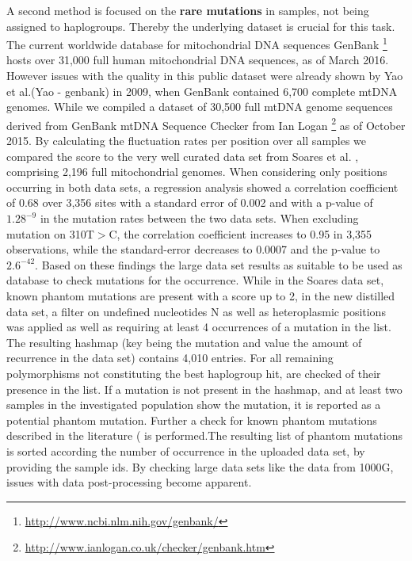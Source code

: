 A second method is focused on the \textbf{rare mutations} in samples, not being assigned to haplogroups. Thereby the underlying dataset is crucial for this task. The current worldwide database for mitochondrial DNA sequences GenBank \footnote{\url{http://www.ncbi.nlm.nih.gov/genbank/}} hosts over 31,000 full human mitochondrial DNA sequences, as of March 2016. However issues with the quality in this public dataset were already shown by Yao et al.(Yao - genbank) in 2009, when GenBank contained 6,700 complete mtDNA genomes. While we compiled a dataset of 30,500 full mtDNA genome sequences derived from GenBank mtDNA Sequence Checker from Ian Logan \footnote{\url{http://www.ianlogan.co.uk/checker/genbank.htm}} as of October 2015. By calculating the fluctuation rates per position over all samples we compared the score to the very well curated data set from Soares et al. \cite{Soares2009}, comprising 2,196 full mitochondrial genomes. When considering only positions occurring in both data sets, a regression analysis showed a correlation coefficient of 0.68 over 3,356 sites with a standard error of 0.002 and with a p-value of $1.28^{-9}$ in the mutation rates between the two data sets. When excluding mutation on 310T$>$C, the correlation coefficient increases to 0.95 in 3,355 observations, while the standard-error decreases to 0.0007 and the p-value to $2.6^{-42}$. Based on these findings the large data set results as suitable to be used as database to check mutations for the occurrence. While in the Soares data set, known phantom mutations are present with a score up to 2, in the new distilled data set, a filter on undefined nucleotides N as well as heteroplasmic positions was applied as well as requiring at least 4 occurrences of a mutation in the list. The resulting hashmap (key being the mutation and value the amount of recurrence in the data set) contains 4,010 entries. For all remaining polymorphisms not constituting the best haplogroup hit, are checked of their presence in the list. If a mutation is not present in the hashmap, and at least two samples in the investigated population show the mutation, it is reported as a potential phantom mutation. Further a check for known phantom mutations described in the literature (\cite{Brandstatter2005,Bandelt2002} is performed.The resulting list of phantom mutations is sorted according the number of occurrence in the uploaded data set, by providing the sample ids. By checking large data sets like the data from 1000G, issues with data post-processing become apparent.

